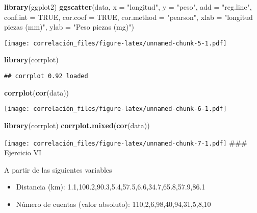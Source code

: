 \documentclass[
]{article}
\newenvironment{Shaded}{\begin{snugshade}}{\end{snugshade}}
\newcommand{\AttributeTok}[1]{\textcolor[rgb]{0.13,0.29,0.53}{#1}}
\newcommand{\ConstantTok}[1]{\textcolor[rgb]{0.56,0.35,0.01}{#1}}
\newcommand{\FunctionTok}[1]{\textcolor[rgb]{0.13,0.29,0.53}{\textbf{#1}}}
\newcommand{\NormalTok}[1]{#1}
\newcommand{\StringTok}[1]{\textcolor[rgb]{0.31,0.60,0.02}{#1}}
\providecommand{\tightlist}{%
  \setlength{\itemsep}{0pt}\setlength{\parskip}{0pt}}
\begin{document}
\begin{Shaded}
\begin{Highlighting}[]
\FunctionTok{library}\NormalTok{(ggplot2)}
\FunctionTok{ggscatter}\NormalTok{(data, }\AttributeTok{x =} \StringTok{"longitud"}\NormalTok{, }\AttributeTok{y =} \StringTok{"peso"}\NormalTok{,}
          \AttributeTok{add =} \StringTok{"reg.line"}\NormalTok{, }\AttributeTok{conf.int =} \ConstantTok{TRUE}\NormalTok{,}
          \AttributeTok{cor.coef =} \ConstantTok{TRUE}\NormalTok{, }\AttributeTok{cor.method =} \StringTok{"pearson"}\NormalTok{,}
          \AttributeTok{xlab =} \StringTok{"longitud piezas (mm)"}\NormalTok{, }\AttributeTok{ylab =} \StringTok{"Peso piezas (mg)"}\NormalTok{)}
\end{Highlighting}
\end{Shaded}

\texttt{[image: correlación\_files/figure-latex/unnamed-chunk-5-1.pdf]}

\begin{Shaded}
\begin{Highlighting}[]
\FunctionTok{library}\NormalTok{(corrplot)}
\end{Highlighting}
\end{Shaded}

\begin{verbatim}
## corrplot 0.92 loaded
\end{verbatim}

\begin{Shaded}
\begin{Highlighting}[]
\FunctionTok{corrplot}\NormalTok{(}\FunctionTok{cor}\NormalTok{(data))}
\end{Highlighting}
\end{Shaded}

\texttt{[image: correlación\_files/figure-latex/unnamed-chunk-6-1.pdf]}

\begin{Shaded}
\begin{Highlighting}[]
\FunctionTok{library}\NormalTok{(corrplot)}
\FunctionTok{corrplot.mixed}\NormalTok{(}\FunctionTok{cor}\NormalTok{(data))}
\end{Highlighting}
\end{Shaded}

\texttt{[image: correlación\_files/figure-latex/unnamed-chunk-7-1.pdf]}
\#\#\# Ejercicio VI

A partir de las siguientes variables

\begin{itemize}
\tightlist
\item
  Distancia (km): 1.1,100.2,90.3,5.4,57.5,6.6,34.7,65.8,57.9,86.1
\item
  Número de cuentas (valor absoluto): 110,2,6,98,40,94,31,5,8,10
\end{itemize}
\end{document}
